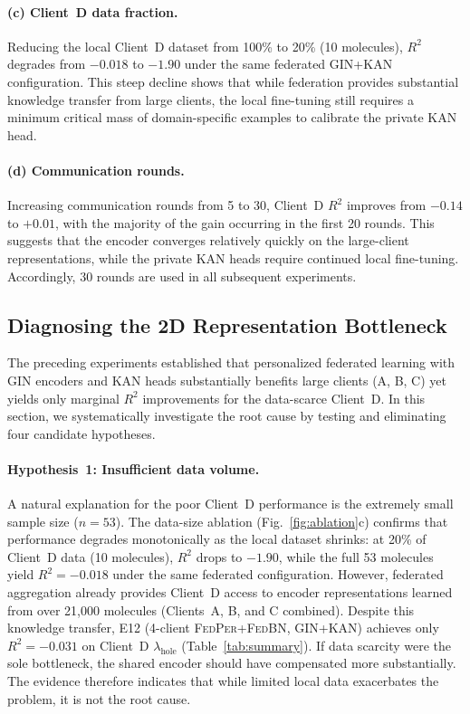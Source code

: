 \documentclass[twocolumn]{article}
\newcommand{\lamhole}{\lambda_{\text{hole}}}
\newcommand{\Rsq}{R^{2}}
\newcommand{\FedPer}{\textsc{FedPer}}
\newcommand{\FedBN}{\textsc{FedBN}}
\begin{document}
\paragraph{(c) Client~D data fraction.}
Reducing the local Client~D dataset from 100\% to 20\% (10 molecules), $\Rsq$ degrades from $-0.018$ to $-1.90$ under the same federated GIN+KAN configuration.
This steep decline shows that while federation provides substantial knowledge transfer from large clients, the local fine-tuning still requires a minimum critical mass of domain-specific examples to calibrate the private KAN head.

\paragraph{(d) Communication rounds.}
Increasing communication rounds from 5 to 30, Client~D $\Rsq$ improves from $-0.14$ to $+0.01$, with the majority of the gain occurring in the first 20 rounds.
This suggests that the encoder converges relatively quickly on the large-client representations, while the private KAN heads require continued local fine-tuning.
Accordingly, 30 rounds are used in all subsequent experiments.

\subsection{Diagnosing the 2D Representation Bottleneck}\label{sec:bottleneck}

The preceding experiments established that personalized federated learning with GIN encoders and KAN heads substantially benefits large clients (A, B, C) yet yields only marginal $\Rsq$ improvements for the data-scarce Client~D.
In this section, we systematically investigate the root cause by testing and eliminating four candidate hypotheses.

\paragraph{Hypothesis~1: Insufficient data volume.}
A natural explanation for the poor Client~D performance is the extremely small sample size ($n = 53$).
The data-size ablation (Fig.~\ref{fig:ablation}c) confirms that performance degrades monotonically as the local dataset shrinks: at 20\% of Client~D data (10 molecules), $\Rsq$ drops to $-1.90$, while the full 53 molecules yield $\Rsq = -0.018$ under the same federated configuration.
However, federated aggregation already provides Client~D access to encoder representations learned from over 21{,}000 molecules (Clients~A, B, and C combined).
Despite this knowledge transfer, E12 (4-client \FedPer{}+\FedBN{}, GIN+KAN) achieves only $\Rsq = -0.031$ on Client~D $\lamhole$ (Table~\ref{tab:summary}).
If data scarcity were the sole bottleneck, the shared encoder should have compensated more substantially.
The evidence therefore indicates that while limited local data exacerbates the problem, it is not the root cause.
\end{document}
